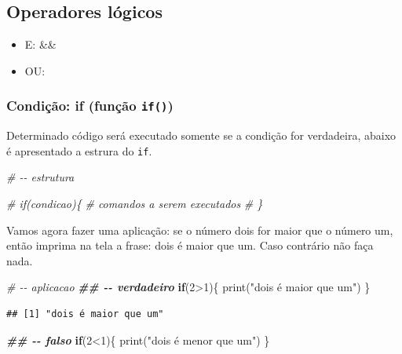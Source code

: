 \documentclass[
]{book}
\newenvironment{Shaded}{\begin{snugshade}}{\end{snugshade}}
\newcommand{\CommentTok}[1]{\textcolor[rgb]{0.56,0.35,0.01}{\textit{#1}}}
\newcommand{\ControlFlowTok}[1]{\textcolor[rgb]{0.13,0.29,0.53}{\textbf{#1}}}
\newcommand{\DecValTok}[1]{\textcolor[rgb]{0.00,0.00,0.81}{#1}}
\newcommand{\DocumentationTok}[1]{\textcolor[rgb]{0.56,0.35,0.01}{\textbf{\textit{#1}}}}
\newcommand{\FunctionTok}[1]{\textcolor[rgb]{0.00,0.00,0.00}{#1}}
\newcommand{\NormalTok}[1]{#1}
\newcommand{\SpecialCharTok}[1]{\textcolor[rgb]{0.00,0.00,0.00}{#1}}
\newcommand{\StringTok}[1]{\textcolor[rgb]{0.31,0.60,0.02}{#1}}
\providecommand{\tightlist}{%
  \setlength{\itemsep}{0pt}\setlength{\parskip}{0pt}}
\theoremstyle{definition}
\theoremstyle{definition}
\theoremstyle{definition}
\theoremstyle{definition}
\theoremstyle{remark}
\begin{document}
\hypertarget{operadores-luxf3gicos}{%
\subsection{Operadores lógicos}\label{operadores-luxf3gicos}}

\begin{itemize}
\tightlist
\item
  E: \&\&
\item
  OU: \textbar\textbar{}
\end{itemize}

\hypertarget{condiuxe7uxe3o-if-funuxe7uxe3o-if}{%
\subsubsection{\texorpdfstring{Condição: if (função \texttt{if()})}{Condição: if (função if())}}\label{condiuxe7uxe3o-if-funuxe7uxe3o-if}}

Determinado código será executado somente se a condição for verdadeira, abaixo é apresentado a estrura do \texttt{if}.

\begin{Shaded}
\begin{Highlighting}[]
\CommentTok{\# {-}{-} estrutura}

\CommentTok{\# if(condicao)\{}
\CommentTok{\#   comandos a serem executados}
\CommentTok{\# \}}
\end{Highlighting}
\end{Shaded}

Vamos agora fazer uma aplicação: se o número dois for maior que o número um, então imprima na tela a frase: dois é maior que um. Caso contrário não faça nada.

\begin{Shaded}
\begin{Highlighting}[]
\CommentTok{\# {-}{-} aplicacao}
\DocumentationTok{\#\# {-}{-} verdadeiro}
\ControlFlowTok{if}\NormalTok{(}\DecValTok{2}\SpecialCharTok{\textgreater{}}\DecValTok{1}\NormalTok{)\{}
  \FunctionTok{print}\NormalTok{(}\StringTok{"dois é maior que um"}\NormalTok{)}
\NormalTok{\}}
\end{Highlighting}
\end{Shaded}

\begin{verbatim}
## [1] "dois é maior que um"
\end{verbatim}

\begin{Shaded}
\begin{Highlighting}[]
\DocumentationTok{\#\# {-}{-} falso}
\ControlFlowTok{if}\NormalTok{(}\DecValTok{2}\SpecialCharTok{\textless{}}\DecValTok{1}\NormalTok{)\{}
  \FunctionTok{print}\NormalTok{(}\StringTok{"dois é menor que um"}\NormalTok{)}
\NormalTok{\}}
\end{Highlighting}
\end{Shaded}
\end{document}

